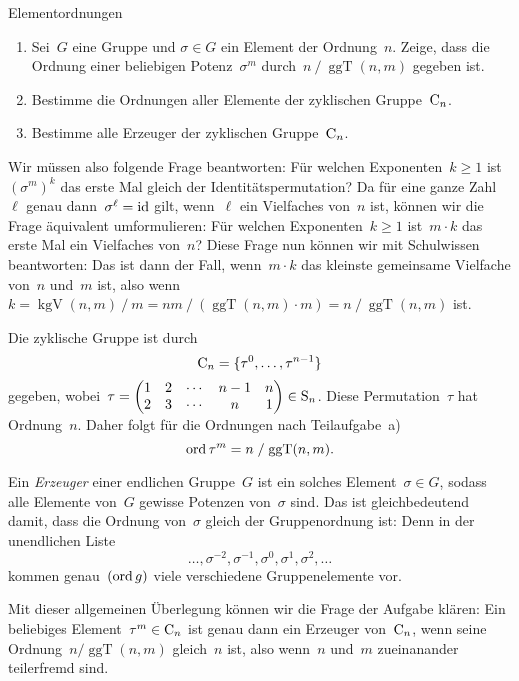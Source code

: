 \documentclass{algblatt}
\begin{document}
\ifloesungen\newpage\fi
\begin{aufgabe}{Elementordnungen}
\begin{enumerate}
\item Sei~$G$ eine Gruppe und $\sigma \in G$ ein Element der Ordnung~$n$.
Zeige, dass die Ordnung einer be\-lie\-bi\-gen Potenz~$\sigma^m$ durch~$n \mathrel{/}
\operatorname{ggT}(n,m)$ gegeben ist.

\item Bestimme die Ordnungen aller Elemente der zyklischen Gruppe~$\mathrm{C}_n$.

\item Bestimme alle Erzeuger der zyklischen Gruppe~$\mathrm{C}_n$.
\end{enumerate}

\begin{loesungE}
\item Wir müssen also folgende Frage beantworten: Für welchen Exponenten~$k
\geq 1$ ist~$(\sigma^m)^k$ das erste Mal gleich der Identitätspermutation?
Da für eine ganze Zahl~$\ell$ genau dann~$\sigma^\ell = \mathrm{id}$ gilt, wenn~$\ell$
ein Vielfaches von~$n$ ist, können wir die Frage äquivalent umformulieren: Für
welchen Exponenten~$k \geq 1$ ist~$m \cdot k$ das erste Mal ein Vielfaches
von~$n$? Diese Frage nun können wir mit Schulwissen beantworten: Das ist dann
der Fall, wenn~$m \cdot k$ das kleinste gemeinsame Vielfache von~$n$ und~$m$
ist, also wenn~$k = \operatorname{kgV}(n,m) \mathrel{/} m = nm \mathrel{/}
(\operatorname{ggT}(n,m) \cdot m) = n \mathrel{/}
\operatorname{ggT}(n,m)$ ist.

\item Die zyklische Gruppe ist durch
\[ \mathrm{C}_n = \{ \tau^0, \ldots, \tau^{n-1} \} \]
gegeben, wobei~$\tau =
\begin{pmatrix}1&2&\cdots&n-1&n\\2&3&\cdots&n&1\end{pmatrix} \in \mathrm{S}_n$.
Diese Permutation~$\tau$ hat Ordnung~$n$. Daher
folgt für die Ordnungen nach Teilaufgabe~a)
\[ \operatorname{ord} \tau^m = n \mathrel{/} \operatorname{ggT}(n,m). \]

\item Ein \emph{Erzeuger} einer endlichen Gruppe~$G$ ist ein solches
Element~$\sigma \in G$, sodass alle Elemente von~$G$ gewisse Potenzen
von~$\sigma$ sind. Das ist gleichbedeutend damit, dass die Ordnung von~$\sigma$
gleich der Gruppenordnung ist: Denn in der unendlichen Liste
\[ \ldots, \sigma^{-2}, \sigma^{-1}, \sigma^0, \sigma^1, \sigma^2, \ldots \]
kommen genau~$(\operatorname{ord} g)$ viele verschiedene Gruppenelemente vor.

Mit dieser allgemeinen Überlegung können wir die Frage der Aufgabe klären: Ein
beliebiges Element~$\tau^m \in \mathrm{C}_n$ ist genau dann ein Erzeuger
von~$\mathrm{C}_n$, wenn seine Ordnung~$n / \operatorname{ggT}(n,m)$ gleich~$n$ ist,
also wenn~$n$ und~$m$ zueinanander teilerfremd sind.
\end{loesungE}
\end{aufgabe}
\end{document}
